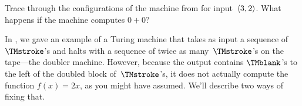 \documentclass[../../../include/open-logic-section]{subfiles}
\begin{document}
\begin{prob}
Trace through the configurations of the machine from
 for input~$\langle 3,2 \rangle$. What happens
if the machine computes $0+0$?
\end{prob}

\begin{explain}
In , we gave an example of a Turing machine
that takes as input a sequence of~$\TMstroke$'s and halts with a sequence
of twice as many~$\TMstroke$'s on the tape---the doubler machine.
However, because the output contains $\TMblank$'s to the left of the
doubled block of~$\TMstroke$'s, it does not actually compute the
function $f(x) = 2x$, as you might have assumed. We'll describe two
ways of fixing that.
\end{explain}
\end{document}
